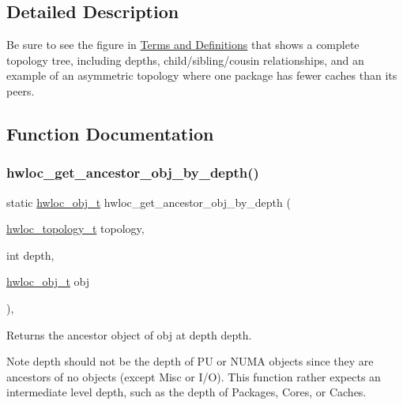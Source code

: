 \subsection{Detailed Description}
Be sure to see the figure in \hyperlink{a00380}{Terms and Definitions} that shows a complete topology tree, including depths, child/sibling/cousin relationships, and an example of an asymmetric topology where one package has fewer caches than its peers. 

\subsection{Function Documentation}
\mbox{\label{a00197_ga9f8c93fde236e9642a96957af01a11cb}} 
\subsubsection{\texorpdfstring{hwloc\+\_\+get\+\_\+ancestor\+\_\+obj\+\_\+by\+\_\+depth()}{hwloc\_get\_ancestor\_obj\_by\_depth()}}
{\footnotesize\ttfamily static \hyperlink{a00185_ga79b8ab56877ef99ac59b833203391c7d}{hwloc\+\_\+obj\+\_\+t} hwloc\+\_\+get\+\_\+ancestor\+\_\+obj\+\_\+by\+\_\+depth (\begin{DoxyParamCaption}\item[{\hyperlink{a00186_ga9d1e76ee15a7dee158b786c30b6a6e38}{hwloc\+\_\+topology\+\_\+t}}]{topology,  }\item[{int}]{depth,  }\item[{\hyperlink{a00185_ga79b8ab56877ef99ac59b833203391c7d}{hwloc\+\_\+obj\+\_\+t}}]{obj }\end{DoxyParamCaption})\hspace{0.3cm}{\ttfamily [inline]}, {\ttfamily [static]}}



Returns the ancestor object of {\ttfamily obj} at depth {\ttfamily depth}. 

\begin{DoxyNote}{Note}
{\ttfamily depth} should not be the depth of PU or N\+U\+MA objects since they are ancestors of no objects (except Misc or I/O). This function rather expects an intermediate level depth, such as the depth of Packages, Cores, or Caches. 
\end{DoxyNote}
\mbox{\label{a00197_ga70f0c7583291da707c15ae4daa850f41}} 
